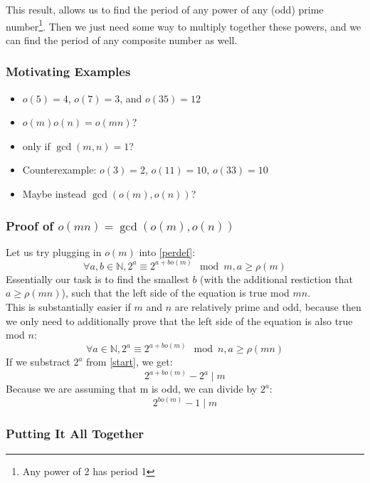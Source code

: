 \documentclass{article}
\begin{document}
  This result, allows us to find the period  of any power of any (odd) prime number\footnote{Any power of 2 has period 1}. Then we just need some way to multiply together these powers, and we can find the period of any composite number as well. 
  \subsubsection{Motivating Examples}
  \begin{itemize}
  \item $o(5) = 4$, $o(7) = 3$, and $o(35) = 12$
  \item $o(m)o(n) = o(mn)$?
  \item only if $\gcd(m, n) = 1$?
  \item Counterexample: $o(3) = 2$, $o(11) = 10$, $o(33) = 10$
  \item Maybe instead $\gcd(o(m), o(n))$? 
  \end{itemize}
  \subsubsection{Proof of $o(mn) = \gcd(o(m), o(n))$}
  Let us try plugging in $o(m)$ into \eqref{perdef}:
  \begin{equation}\label{start}
    \forall a, b \in \mathbb{N}, 2^a \equiv 2^{a+bo(m)} \mod m, a \geq \rho(m)
  \end{equation}
  Essentially our task is to find the smallest $b$ (with the additional restiction that $a \geq \rho(mn)$), such that the left side of the equation is true mod $mn$.\\ 

  This is substantially easier if $m$ and $n$ are relatively prime and odd, because then we only need to additionally prove that the left side of the equation is also true mod $n$:
  \begin{equation}
    \forall a \in \mathbb{N}, 2^a \equiv 2^{a + bo(m)} \mod n, a \geq \rho(mn)
  \end{equation}
  If we substract $2^a$ from \eqref{start}, we get:
  \begin{equation}
    2^{a+bo(m)} - 2^a \mid m 
  \end{equation}
  Because we are assuming that m is odd, we can divide by $2^a$:
  \begin{equation}
    2^{bo(m)} - 1 \mid m
  \end{equation}

  \subsubsection{Putting It All Together}
\end{document}
